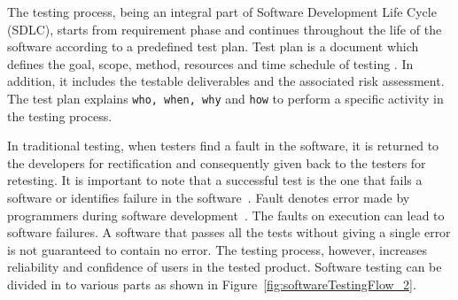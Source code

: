 The testing process, being an integral part of Software Development Life Cycle (SDLC), starts from requirement phase and continues throughout the life of the software according to a predefined test plan. Test plan is a document which defines the goal, scope, method, resources and time schedule of testing \cite{futrell2001quality}. In addition, it includes the testable deliverables and the associated risk assessment. The test plan explains \verb+who, when, why+ and \verb+how+ to perform a specific activity in the testing process. 

In traditional testing, when testers find a fault in the software, it is returned to the developers for rectification and consequently given back to the testers for retesting. It is important to note that a successful test is the one that fails a software or identifies failure in the software~\cite{myers2011art}. Fault denotes error made by programmers during software development~\cite{american1984}. The faults on execution can lead to software failures. A software that passes all the tests without giving a single error is not guaranteed to contain no error. The testing process, however, increases reliability and confidence of users in the tested product. Software testing can be divided in to various parts as shown in Figure~\ref{fig:softwareTestingFlow_2}.



